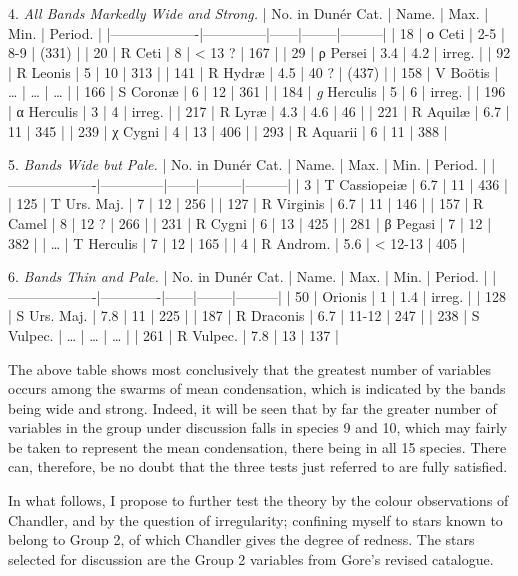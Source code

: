 \documentclass[a4paper, 12pt, oneside, polutonikogreek, english]{article}
\begin{document}
4. \emph{All Bands Markedly Wide and Strong.} 
| No. in Dunér Cat. | Name.    | Max. | Min.  | Period. |
|-------------------|--------------|------|--------|---------|
| 18        | ο Ceti    | 2-5 | 8-9  | (331)  |
| 20        | R Ceti    | 8  | < 13 ? | 167   |
| 29        | ρ Persei   | 3.4 | 4.2  | irreg. |
| 92        | R Leonis   | 5  | 10   | 313   |
| 141        | R Hydræ   | 4.5 | 40 ?  | (437)  |
| 158        | V Boötis   | …  | …   | …    |
| 166        | S Coronæ   | 6  | 12   | 361   |
| 184        | \emph{g} Herculis | 5  | 6   | irreg. |
| 196        | α Herculis  | 3  | 4   | irreg. |
| 217        | R Lyræ    | 4.3 | 4.6  | 46   |
| 221        | R Aquilæ   | 6.7 | 11   | 345   |
| 239        | χ Cygni   | 4  | 13   | 406   |
| 293        | R Aquarii  | 6  | 11   | 388   |

5. \emph{Bands Wide but Pale.} 
| No. in Dunér Cat. | Name.    | Max. | Min.  | Period. |
|-------------------|--------------|------|---------|---------|
| 3         | T Cassiopeiæ | 6.7 | 11   | 436   |
| 125        | T Urs. Maj. | 7  | 12   | 256   |
| 127        | R Virginis  | 6.7 | 11   | 146   |
| 157        | R Camel   | 8  | 12 ?  | 266   |
| 231        | R Cygni   | 6  | 13   | 425   |
| 281        | β Pegasi   | 7  | 12   | 382   |
| …         | T Herculis  | 7  | 12   | 165   |
| 4         | R Androm.  | 5.6 | < 12-13 | 405   |

6. \emph{Bands Thin and Pale.} 
| No. in Dunér Cat. | Name.    | Max. | Min.  | Period. |
|-------------------|-------------|------|--------|---------|
| 50        | Orionis   | 1  | 1.4  | irreg. |
| 128        | S Urs. Maj. | 7.8 | 11   | 225   |
| 187        | R Draconis | 6.7 | 11-12 | 247   |
| 238        | S Vulpec.  | …  | …   | …    |
| 261        | R Vulpec.  | 7.8 | 13   | 137   |

The above table shows most conclusively that the greatest number of variables occurs among the swarms of mean condensation, which is indicated by the bands being wide and strong. Indeed, it will be seen that by far the greater number of variables in the group under discussion falls in species 9 and 10, which may fairly be taken to represent the mean condensation, there being in all 15 species. There can, therefore, be no doubt that the three tests just referred to are fully satisfied.

In what follows, I propose to further test the theory by the colour observations of Chandler, and by the question of irregularity; confining myself to stars known to belong to Group 2, of which Chandler gives the degree of redness. The stars selected for discussion are the Group 2 variables from Gore's revised catalogue.
\end{document}
